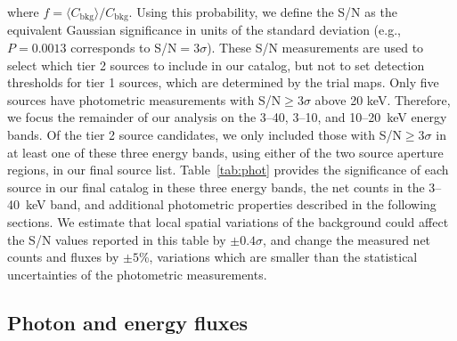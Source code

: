 \documentclass[iop,revtex4]{emulateapj}
\begin{document}
where $f = \langle C_{\mathrm{bkg}} \rangle/C_{\mathrm{bkg}}$.  Using this probability, we define the S/N as the equivalent Gaussian significance in units of the standard deviation (e.g., $P=0.0013$ corresponds to S/N$=3\sigma$).  These S/N measurements are used to select which tier 2 sources to include in our catalog, but not to set detection thresholds for tier 1 sources, which are determined by the trial maps.  Only five sources have photometric measurements with S/N$\geq3\sigma$ above 20 keV.  Therefore, we focus the remainder of our analysis on the 3--40, 3--10, and 10--20~keV energy bands.  Of the tier 2 source candidates, we only included those with S/N$\geq3\sigma$ in at least one of these three energy bands, using either of the two source aperture regions, in our final source list.   Table~\ref{tab:phot} provides the significance of each source in our final catalog in these three energy bands, the net counts in the 3--40~keV band, and additional photometric properties described in the following sections.  We estimate that local spatial variations of the background could affect the S/N values reported in this table by $\pm0.4\sigma$, and change the measured net counts and fluxes by $\pm5$\%, variations which are smaller than the statistical uncertainties of the photometric measurements. 

\subsection{Photon and energy fluxes}
\end{document}
